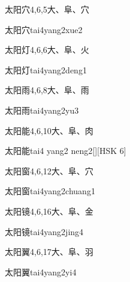 \begin{Entry}{太阳穴}{4,6,5}{⼤、⾩、⽳}
  \begin{Phonetics}{太阳穴}{tai4yang2xue2}
  \end{Phonetics}
\end{Entry}

\begin{Entry}{太阳灯}{4,6,6}{⼤、⾩、⽕}
  \begin{Phonetics}{太阳灯}{tai4yang2deng1}
  \end{Phonetics}
\end{Entry}

\begin{Entry}{太阳雨}{4,6,8}{⼤、⾩、⾬}
  \begin{Phonetics}{太阳雨}{tai4yang2yu3}
  \end{Phonetics}
\end{Entry}

\begin{Entry}{太阳能}{4,6,10}{⼤、⾩、⾁}
  \begin{Phonetics}{太阳能}{tai4 yang2 neng2}[][HSK 6]
  \end{Phonetics}
\end{Entry}

\begin{Entry}{太阳窗}{4,6,12}{⼤、⾩、⽳}
  \begin{Phonetics}{太阳窗}{tai4yang2chuang1}
  \end{Phonetics}
\end{Entry}

\begin{Entry}{太阳镜}{4,6,16}{⼤、⾩、⾦}
  \begin{Phonetics}{太阳镜}{tai4yang2jing4}
  \end{Phonetics}
\end{Entry}

\begin{Entry}{太阳翼}{4,6,17}{⼤、⾩、⽻}
  \begin{Phonetics}{太阳翼}{tai4yang2yi4}
  \end{Phonetics}
\end{Entry}

